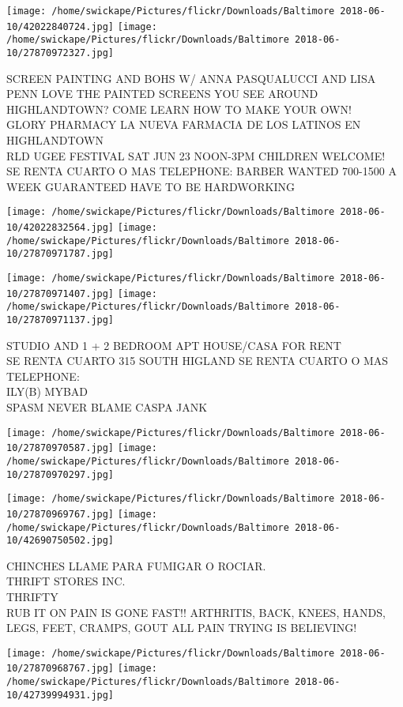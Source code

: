 \documentclass[10pt,letterpaper]{article}
\begin{document}
\texttt{[image: /home/swickape/Pictures/flickr/Downloads/Baltimore 2018-06-10/42022840724.jpg]}
\texttt{[image: /home/swickape/Pictures/flickr/Downloads/Baltimore 2018-06-10/27870972327.jpg]}

SCREEN PAINTING AND BOHS W/ ANNA PASQUALUCCI AND LISA PENN LOVE THE PAINTED SCREENS YOU SEE AROUND HIGHLANDTOWN?  COME LEARN HOW TO MAKE YOUR OWN!\\
GLORY PHARMACY LA NUEVA FARMACIA DE LOS LATINOS EN HIGHLANDTOWN\\
RLD UGEE FESTIVAL SAT JUN 23 NOON{-}3PM CHILDREN WELCOME!\\
SE RENTA CUARTO O MAS TELEPHONE: BARBER WANTED 700{-}1500 A WEEK GUARANTEED HAVE TO BE HARDWORKING
\pagebreak

\texttt{[image: /home/swickape/Pictures/flickr/Downloads/Baltimore 2018-06-10/42022832564.jpg]}
\texttt{[image: /home/swickape/Pictures/flickr/Downloads/Baltimore 2018-06-10/27870971787.jpg]}

\texttt{[image: /home/swickape/Pictures/flickr/Downloads/Baltimore 2018-06-10/27870971407.jpg]}
\texttt{[image: /home/swickape/Pictures/flickr/Downloads/Baltimore 2018-06-10/27870971137.jpg]}

STUDIO AND 1 + 2 BEDROOM APT HOUSE/CASA FOR RENT\\
SE RENTA CUARTO 315 SOUTH HIGLAND SE RENTA CUARTO O MAS TELEPHONE:\\
ILY(B) MYBAD\\
SPASM NEVER BLAME CASPA JANK
\pagebreak

\texttt{[image: /home/swickape/Pictures/flickr/Downloads/Baltimore 2018-06-10/27870970587.jpg]}
\texttt{[image: /home/swickape/Pictures/flickr/Downloads/Baltimore 2018-06-10/27870970297.jpg]}

\texttt{[image: /home/swickape/Pictures/flickr/Downloads/Baltimore 2018-06-10/27870969767.jpg]}
\texttt{[image: /home/swickape/Pictures/flickr/Downloads/Baltimore 2018-06-10/42690750502.jpg]}

CHINCHES LLAME PARA FUMIGAR O ROCIAR.\\
THRIFT STORES INC.\\
THRIFTY\\
RUB IT ON PAIN IS GONE FAST!! ARTHRITIS, BACK, KNEES, HANDS, LEGS, FEET, CRAMPS, GOUT ALL PAIN TRYING IS BELIEVING!
\pagebreak

\texttt{[image: /home/swickape/Pictures/flickr/Downloads/Baltimore 2018-06-10/27870968767.jpg]}
\texttt{[image: /home/swickape/Pictures/flickr/Downloads/Baltimore 2018-06-10/42739994931.jpg]}
\end{document}
